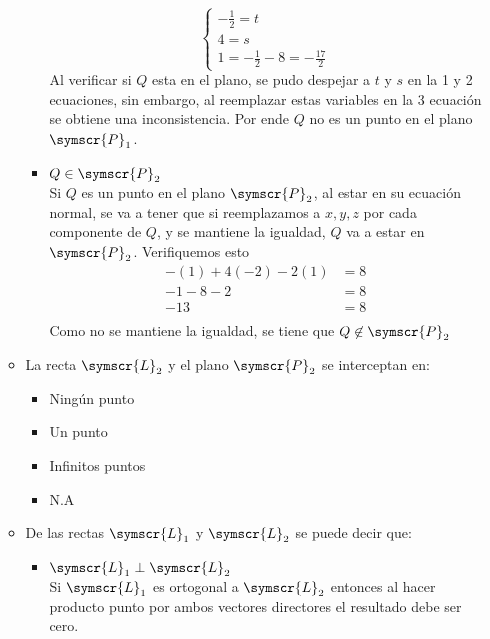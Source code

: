 \documentclass{article}
\def\fancyL{\symscr{L}}
\def\fancyP{\symscr{P}}
\begin{document}
\begin{enumerate}
\begin{itemize}
\begin{itemize}
\[\begin{cases}
                            -\frac{1}{2} = t \\
                            4 = s \\
                            1 = -\frac{1}{2} - 8 = -\frac{17}{2}
                        \end{cases}
                    \]
                    Al verificar si \(Q\) esta en el plano, se pudo despejar a \(t\) y \(s\) en la 1 y 2 ecuaciones, sin embargo, 
                    al reemplazar estas variables en la 3 ecuación se obtiene una inconsistencia.
                    Por ende \(Q\) no es un punto en el plano \(\fancyP_1\).
                \item \(Q \in \fancyP_2\) \\
                    Si \(Q\) es un punto en el plano \(\fancyP_2\), al estar en su ecuación normal, se va a tener que si reemplazamos a \(x, y, z\) por 
                    cada componente de \(Q\), y se mantiene la igualdad, \(Q\) va a estar en \(\fancyP_2\). Verifiquemos esto
                    \[
                        \begin{aligned}
                            -(1) + 4(-2) -2(1) &= 8 \\
                            -1 -8 -2 &= 8 \\
                            -13 &= 8 \\
                        \end{aligned}
                    \]
                    Como no se mantiene la igualdad, se tiene que \(Q \not\in \fancyP_2\)
            \end{itemize}
        \item La recta \(\fancyL_2\) y el plano \(\fancyP_2\) se interceptan en:
            \begin{itemize}
				\item Ningún punto
				\item Un punto
				\item Infinitos puntos
				\item N.A
            \end{itemize}
        \item De las rectas \(\fancyL_1\) y \(\fancyL_2\) se puede decir que:
            \begin{itemize}
                \item \(\fancyL_1 \perp \fancyL_2\) \\
                    Si \(\fancyL_1\) es ortogonal a \(\fancyL_2\) entonces al hacer producto punto por ambos vectores directores el resultado debe ser cero.

\end{itemize}
\end{itemize}
\end{enumerate}
\end{document}
